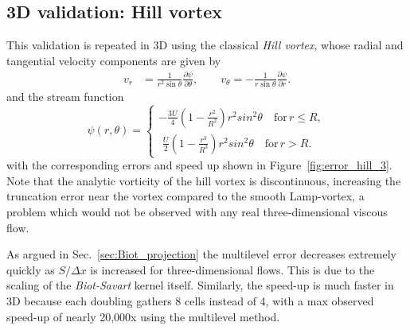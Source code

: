 \documentclass{article}
\begin{document}
\subsection{3D validation: Hill vortex}

This validation is repeated in 3D using the classical \emph{Hill vortex}, whose radial and tangential velocity components are given by
\begin{align}
    v_r &= \frac{1}{r^2\sin\theta}\frac{\partial\psi}{\partial\theta}, \qquad v_\theta = -\frac{1}{r\sin\theta}\frac{\partial\psi}{\partial r}.
\end{align}
and the stream function 
\begin{equation}
    \psi(r,\theta) = \begin{cases}
    -\frac{3U}{4}\left(1-\frac{r^2}{R^2}\right)r^2sin^2\theta \quad \text{for} \, r \le R,\\
     \,\,\frac{U}{2}\left(1-\frac{r^3}{R^3}\right)r^2sin^2\theta \quad \text{for} \, r > R.
    \end{cases}
\end{equation}
with the corresponding errors and speed up shown in Figure~\ref{fig:error_hill_3}. Note that the analytic vorticity of the hill vortex is discontinuous, increasing the truncation error near the vortex compared to the smooth Lamp-vortex, a problem which would not be observed with any real three-dimensional viscous flow.

As argued in Sec.~\ref{sec:Biot_projection} the multilevel error decreases extremely quickly as $S/\Delta x$ is increased for three-dimensional flows. This is due to the scaling of the \emph{Biot-Savart} kernel itself. Similarly, the speed-up is much faster in 3D because each doubling gathers 8 cells instead of 4, with a max observed speed-up of nearly 20,000x using the multilevel method.
\end{document}
